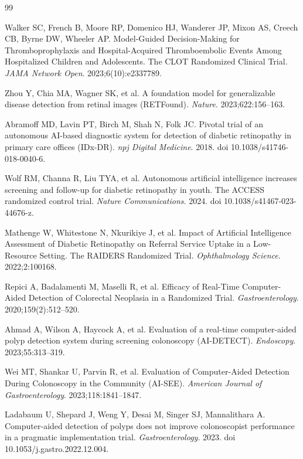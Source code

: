 \documentclass{article}
\begin{document}
\begin{thebibliography}{99}
\small

 Walker SC, French B, Moore RP, Domenico HJ, Wanderer JP, Mixon AS, Creech CB,
Byrne DW, Wheeler AP. Model-Guided Decision-Making for Thromboprophylaxis and Hospital-Acquired
Thromboembolic Events Among Hospitalized Children and Adolescents. The CLOT Randomized Clinical
Trial. \emph{JAMA Network Open}. 2023;6(10):e2337789.

 Zhou Y, Chia MA, Wagner SK, et al. A foundation model for generalizable disease
detection from retinal images (RETFound). \emph{Nature}. 2023;622:156--163.

 Abramoff MD, Lavin PT, Birch M, Shah N, Folk JC. Pivotal trial of an
autonomous AI-based diagnostic system for detection of diabetic retinopathy in primary care offices
(IDx-DR). \emph{npj Digital Medicine}. 2018. doi 10.1038/s41746-018-0040-6.

 Wolf RM, Channa R, Liu TYA, et al. Autonomous artificial intelligence increases
screening and follow-up for diabetic retinopathy in youth. The ACCESS randomized control trial.
\emph{Nature Communications}. 2024. doi 10.1038/s41467-023-44676-z.

 Mathenge W, Whitestone N, Nkurikiye J, et al. Impact of Artificial
Intelligence Assessment of Diabetic Retinopathy on Referral Service Uptake in a Low-Resource
Setting. The RAIDERS Randomized Trial. \emph{Ophthalmology Science}. 2022;2:100168.

 Repici A, Badalamenti M, Maselli R, et al. Efficacy of Real-Time
Computer-Aided Detection of Colorectal Neoplasia in a Randomized Trial. \emph{Gastroenterology}.
2020;159(2):512--520.

 Ahmad A, Wilson A, Haycock A, et al. Evaluation of a real-time computer-aided
polyp detection system during screening colonoscopy (AI-DETECT). \emph{Endoscopy}.
2023;55:313--319.

 Wei MT, Shankar U, Parvin R, et al. Evaluation of Computer-Aided Detection During
Colonoscopy in the Community (AI-SEE). \emph{American Journal of Gastroenterology}.
2023;118:1841--1847.

 Ladabaum U, Shepard J, Weng Y, Desai M, Singer SJ, Mannalithara A.
Computer-aided detection of polyps does not improve colonoscopist performance in a pragmatic
implementation trial. \emph{Gastroenterology}. 2023. doi 10.1053/j.gastro.2022.12.004.


\end{thebibliography}
\end{document}

